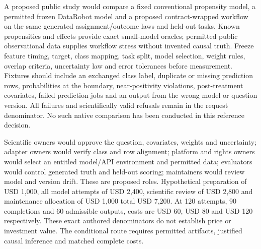 A proposed public study would compare a fixed conventional propensity model,
a permitted frozen DataRobot model and a proposed contract-wrapped workflow on
the same generated assignment/outcome laws and held-out tasks. Known
propensities and effects provide exact small-model oracles; permitted public
observational data supplies workflow stress without invented causal truth.
Freeze feature timing, target, class mapping, task split, model selection,
weight rules, overlap criteria, uncertainty law and error tolerances before
measurement. Fixtures should include an exchanged class label, duplicate or
missing prediction rows, probabilities at the boundary, near-positivity
violations, post-treatment covariates, failed prediction jobs and an output
from the wrong model or question version. All failures and scientifically
valid refusals remain in the request denominator. No such native comparison
has been conducted in this reference decision.~\citep{exec25_datarobot_choice}

Scientific owners would approve the question, covariates, weights and
uncertainty; adapter owners would verify class and row alignment; platform and
rights owners would select an entitled model/API environment and permitted
data; evaluators would control generated truth and held-out scoring;
maintainers would review model and version drift. These are proposed roles.
Hypothetical preparation of USD 1,000, all model attempts of USD 2,400,
scientific review of USD 2,800 and maintenance allocation of USD 1,000 total
USD 7,200. At 120 attempts, 90 completions and 60 admissible outputs, costs are
USD 60, USD 80 and USD 120 respectively. These exact authored denominators do
not establish price or investment value. The conditional route requires
permitted artifacts, justified causal inference and matched complete costs.
\citep{exec25_datarobot_choice}
